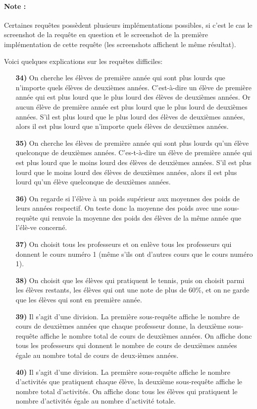 \documentclass{report}
\begin{document}
\paragraph{Note :}Certaines requêtes possèdent plusieurs implémentations possibles, si c'est le cas le screenshot de la requête en question et le screenshot de la première implémentation de cette requête (les screenshots affichent le même résultat).

Voici quelques explications sur les requêtes difficiles:
\begin{itemize}
	\item[\bf{34)}] On cherche les élèves de première année qui sont plus lourds que n'importe quels élèves de deuxièmes années. C'est-à-dire un élève de première année qui est plus lourd que le plus lourd des élèves de deuxièmes années. Or aucun élève de première année est plus lourd que le plus lourd de deuxièmes années. S'il est plus lourd que le plus lourd des élèves de deuxièmes années, alors il est plus lourd que n'importe quels élèves de deuxièmes années.
	\item[\bf{35)}] On cherche les élèves de première année qui sont plus lourds qu'un élève quelconque de deuxièmes années. C'es-t-à-dire un élève de première année qui est plus lourd que le moins lourd des élèves de deuxièmes années. S'il est plus lourd que le moins lourd des élèves de deuxièmes années, alors il est plus lourd qu'un élève quelconque de deuxièmes années.
	\item[\bf{36)}] On regarde si l'élève à un poids supérieur aux moyennes des poids de leurs années respectif. On teste donc la moyenne des poids avec une sous-requête qui renvoie la moyenne des poids des élèves de la même année que l'élè-ve concerné.
	\item[\bf{37)}] On choisit tous les professeurs et on enlève tous les professeurs qui donnent le cours numéro 1 (même s'ils ont d'autres cours que le cours numéro 1).
	\item[\bf{38)}] On choisit que les élèves qui pratiquent le tennis, puis on choisit parmi les élèves restants, les élèves qui ont une note de plus de 60\%, et on ne garde que les élèves qui sont en première année.
	\item[\bf{39)}] Il s'agit d'une division. La première sous-requête affiche le nombre de cours de deuxièmes années que chaque professeur donne, la deuxième sous-requête affiche le nombre total de cours de deuxièmes années. On affiche donc tous les professeurs qui donnent le nombre de cours de deuxièmes années égale au nombre total de cours de deux-ièmes années.
	\item[\bf{40)}] Il s'agit d'une division. La première sous-requête affiche le nombre d'activités que pratiquent chaque élève, la deuxième sous-requête affiche le nombre total d'activités. On affiche donc tous les élèves qui pratiquent le nombre d'activités égale au nombre d'activité totale.
\end{itemize}
\end{document}
